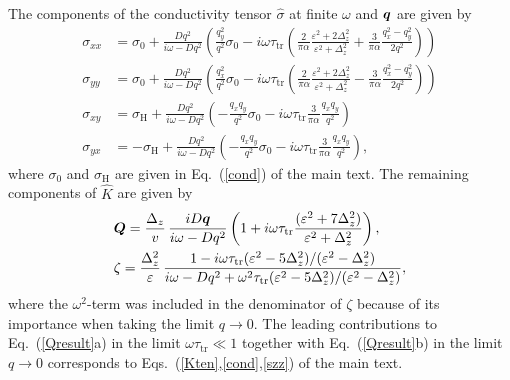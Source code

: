 The components of the conductivity tensor $\hat{\sigma}$ at finite $\omega$ and $\boldsymbol{q}$ are given by
\beml
\label{chap1:eq:sconductivity}
\begin{align}
  \sigma_{xx} &= \sigma_0+\frac{Dq^2}{i\omega-Dq^2}\left(\frac{q_y^2}{q^2} \sigma_0
  -i\omega \tau_\text{tr}\left(\frac{2}{\pi\alpha}\frac{\varepsilon^2+2\Delta_z^2}{\varepsilon^2+\Delta_z^2}+\frac{3}{\pi\alpha}\frac{q_{x}^2-q_{y}^2}{2q^2}\right)\right)\\
  \sigma_{yy} &=  \sigma_0+\frac{Dq^2}{i\omega-Dq^2}\left(\frac{q_x^2}{q^2} \sigma_0
    -i\omega \tau_\text{tr}\left(\frac{2}{\pi\alpha}\frac{\varepsilon^2+2\Delta_z^2}{\varepsilon^2+\Delta_z^2}-\frac{3}{\pi\alpha}\frac{q_{x}^2-q_{y}^2}{2q^2}\right)\right)\\
    \sigma_{xy} &= \sigma_\textrm{H}+\frac{Dq^2}{i\omega-Dq^2}\left(-\frac{q_xq_y}{q^2} \sigma_0-i\omega\tau_\text{tr}\frac{3}{\pi\alpha}\frac{q_xq_y}{q^2}\right)\\
  \sigma_{yx} &= -\sigma_\textrm{H}+\frac{Dq^2}{i\omega-Dq^2}\left(-\frac{q_xq_y}{q^2} \sigma_0-i\omega\tau_\text{tr}\frac{3}{\pi\alpha}\frac{q_xq_y}{q^2}\right),
\end{align}
\eml
where $\sigma_0$ and $\sigma_\textrm{H}$ are given in Eq.~(\ref{cond}) of the main text. 
The remaining components of $\hat{K}$ are given by
\beml
\label{Qresult}
\begin{align}
&\boldsymbol{Q}=\frac{\Delta_z}{ v}\, \frac{i D \boldsymbol{q}}{i\omega-Dq^2}
\left(1+i\omega\tau_\text{tr}\frac{(\varepsilon^2+7\Delta_z^2)}{\varepsilon^2+\Delta_z^2}\right),\\
&\zeta=\frac{\Delta_z^2}{ \varepsilon}\,\frac{1-i\omega\tau_\text{tr}(\varepsilon^2-5\Delta_z^2)/(\varepsilon^2-\Delta_z^2)}{i\omega-Dq^2+\omega^2\tau_\text{tr}(\varepsilon^2-5\Delta_z^2)/(\varepsilon^2-\Delta_z^2)}
,
\end{align}
\eml
 where the $\omega^2$-term was included in the denominator of $\zeta$ because of its importance when taking the limit $q\rightarrow 0$.
The leading contributions to Eq.~(\ref{Qresult}a) in the limit $\omega\tau_\text{tr}\ll 1$ together with Eq.~(\ref{Qresult}b) in the limit $q\rightarrow0$ corresponds to Eqs.~(\ref{Kten},\ref{cond},\ref{szz}) of the main text. 

